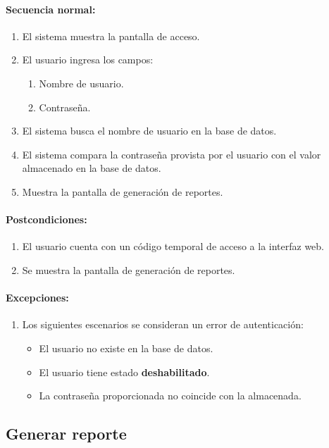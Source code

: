 \paragraph{Secuencia normal:}
\begin{enumerate}
  \item El sistema muestra la pantalla de acceso.
  \item El usuario ingresa los campos:
  \begin{enumerate}
    \item Nombre de usuario.
    \item Contraseña.
  \end{enumerate}
  \item El sistema busca el nombre de usuario en la base de datos.
  \item El sistema compara la contraseña provista por el usuario con el valor almacenado en la base de datos.
  \item Muestra la pantalla de generación de reportes.
\end{enumerate}
\paragraph{Postcondiciones:}
\begin{enumerate}
  \item El usuario cuenta con un código temporal de acceso a la interfaz web.
  \item Se muestra la pantalla de generación de reportes.
\end{enumerate}
\paragraph{Excepciones:}
\begin{enumerate}
  \item Los siguientes escenarios se consideran un error de autenticación:
  \begin{itemize}
    \item El usuario no existe en la base de datos.
    \item El usuario tiene estado \textbf{deshabilitado}.
    \item La contraseña proporcionada no coincide con la almacenada. 
  \end{itemize}
\end{enumerate}

\subsection{Generar reporte}\label{cu-generar-reporte}
